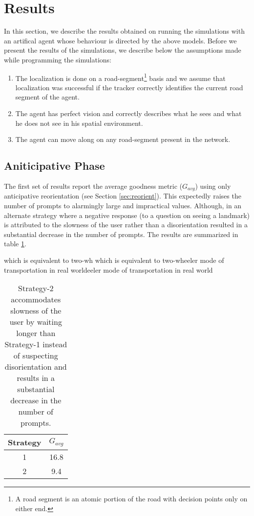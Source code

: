 \documentclass{iitkthesis}
\begin{document}
 \section{Results} 
In this section, we describe the results obtained on running the 
simulations with an artifical agent whose behaviour is directed 
by the above models.
Before we present the results of the simulations, we describe below the 
assumptions made while programming the simulations:
 \begin{enumerate}
   \item The localization is done on a road-segment\footnote{A road 
segment is an atomic portion of the road with decision points
only on either end.} basis and we assume that 
localization was successful if the tracker correctly identifies the 
current road segment of the agent.
   \item The agent has perfect vision and correctly describes what he 
sees and what he does not see in his spatial environment.
   \item The agent can move along on any road-segment present in the 
network. 
 \end{enumerate}
 \subsection*{Aniticipative Phase}
The first set of results report the average goodness metric ($G_{avg}$) 
using only anticipative reorientation (see Section 
\ref{sec:reorient}). This expectedly raises 
the number of prompts to alarmingly large and impractical values. 
Although, in an alternate strategy where a negative response (to 
a question on seeing a landmark) is attributed to the slowness of the user 
rather than a disorientation resulted in a substantial decrease in the 
number of prompts. The results are summarized in table \ref{table:st}.
\begin{table}[h]
\center which is equivalent to two-wh which is equivalent to two-wheeler mode of transportation in real 
worldeeler mode of transportation in real 
world
\begin{tabular}{|c|c|}
\hline
\textbf{Strategy} & $G_{avg}$ \\ \hline
1 & 16.8 \\ \hline
2 & 9.4\\ \hline
\end{tabular}
\caption{Strategy-2 accommodates slowness of the user by waiting longer 
than Strategy-1 instead of suspecting disorientation and results in a 
substantial decrease in the number of prompts.}
\label{table:st}
\end{table}
\end{document}
